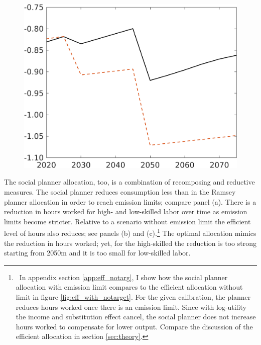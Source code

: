 \begin{figure}[h!!]
\begin{minipage}[]{0.32\textwidth}
\end{minipage}
\begin{minipage}[]{0.32\textwidth}
	\includegraphics[width=1\textwidth]{../../codding_model/own_basedOnFried/optimalPol_190722_tidiedUp/figures/all_July22/SWF_CompEffOPT_T_NoTaus_regime3_opteff_spillover0_noskill0_sep1_xgrowth0_countec0_etaa0.79_lgd0_lff0.png}
\end{minipage}
\end{figure}

The social planner allocation, too, is a combination of recomposing and reductive measures. 
The social planner reduces consumption less than in the Ramsey planner allocation in order to reach emission limits; compare panel (a). There is a reduction in hours worked for high- and low-skilled labor over time as emission limits become stricter. Relative to a scenario without emission limit the efficient level of hours also reduces; see panels (b) and (c).\footnote{\ In appendix section \ref{app:eff_notarg}, I show how the social planner allocation with emission limit compares to the efficient allocation without limit in figure \ref{fig:eff_with_notarget}. For the given calibration, the planner reduces hours worked once there is an emission limit. Since with log-utility the income and substitution effect cancel, the social planner does not increase hours worked to compensate for lower output. Compare the discussion of the efficient allocation in section \ref{sec:theory}.} 
The optimal allocation mimics the reduction in hours worked; yet, for the high-skilled the reduction is too strong starting from 2050m and it is too small for low-skilled labor. 

